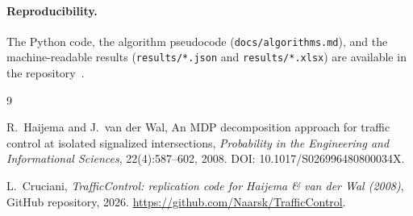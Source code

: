 \documentclass[11pt,a4paper]{article}
\begin{document}
\paragraph{Reproducibility.}
The Python code, the algorithm pseudocode
(\texttt{docs/algorithms.md}), and the machine-readable results
(\texttt{results/*.json} and \texttt{results/*.xlsx}) are available in
the repository~\cite{repo}.


\begin{thebibliography}{9}

R.~Haijema and J.~van der Wal,
\newblock An MDP decomposition approach for traffic control at
isolated signalized intersections,
\newblock \emph{Probability in the Engineering and Informational
Sciences}, 22(4):587--602, 2008.
\newblock DOI: 10.1017/S026996480800034X.

L.~Cruciani,
\newblock \emph{TrafficControl: replication code for Haijema \& van der
Wal (2008)},
\newblock GitHub repository, 2026.
\newblock \url{https://github.com/Naarsk/TrafficControl}.

\end{thebibliography}
\end{document}
